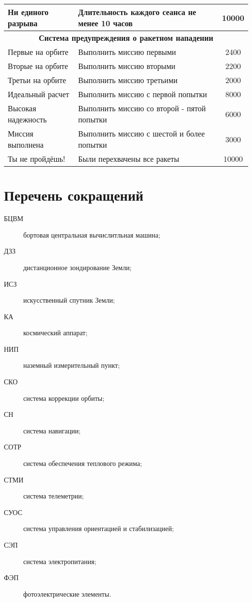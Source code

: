 \documentclass[12pt,a4paper]{article}
\begin{document}
\begin{center}
\begin{longtable}{ |p{5cm}|p{8cm}|c|}
  \hline
  Ни единого разрыва & Длительность каждого сеанса не менее 10 часов & 10000\\
  \hline
  \multicolumn{3}{|c|}{\textbf{Система предупреждения о ракетном нападении}}\\
  \hline
  Первые на орбите & Выполнить миссию первыми & 2400\\
  \hline
  Вторые на орбите & Выполнить миссию вторыми & 2200\\
  \hline
  Третьи на орбите & Выполнить миссию третьими & 2000\\
  \hline
  Идеальный расчет & Выполнить миссию с первой попытки & 8000\\
  \hline
  Высокая надежность & Выполнить миссию со второй - пятой попытки & 6000\\
  \hline
  Миссия выполнена & Выполнить миссию с шестой и более попытки & 3000\\
  \hline
  Ты не пройдёшь! & Были перехвачены все ракеты & 10000\\
  \hline
\end{longtable}
\end{center}

\section*{Перечень сокращений}

\begin{description}
\item[БЦВМ] бортовая центральная вычислитльная машина;
\item[ДЗЗ] дистанционное зондирование Земли;
\item[ИСЗ] искусственный спутник Земли;
\item[КА] космический аппарат;
\item[НИП] наземный измерительный пункт;
\item[СКО] система коррекции орбиты;
\item[СН] система навигации;
\item[СОТР] система обеспечения теплового режима;
\item[СТМИ] система телеметрии;
\item[СУОС] система управления ориентацией и стабилизацией;
\item[СЭП] система электропитания;
\item[ФЭП] фотоэлектрические элементы.
\end{description}
\end{document}

